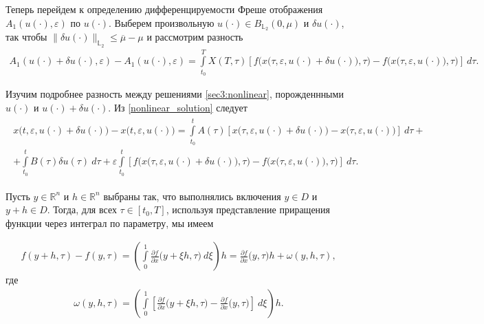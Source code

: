 \documentclass[../main.tex]{subfiles}
\begin{document}
Теперь перейдем к определению дифференцируемости Фреше отображения $A_1(u(\cdot),\varepsilon)$ по $u(\cdot)$.
Выберем произвольную $u(\cdot) \in B_{\mathbb{L}_2}(0,\mu)$ и $\delta u(\cdot)$, так чтобы $\|\delta u(\cdot)\|_{\mathbb{L}_2} \leqslant \overline{\mu}-\mu$ и рассмотрим разность
\begin{gather}\label{diff_A}
    A_1(u(\cdot) + \delta u(\cdot),\varepsilon) - A_1(u(\cdot) ,\varepsilon) = \int\limits_{t_0}^T X(T,\tau) \left[ 
    f\Big(x\big(\tau,\varepsilon, u(\cdot) + \delta u(\cdot)\big),\tau\Big) - 
    f\Big(x\big(\tau,\varepsilon, u(\cdot)\big),\tau\Big) \right]\ d\tau.
\end{gather}

Изучим подробнее разность между решениями \eqref{sec3:nonlinear}, порожденнными $u(\cdot)$ и $u(\cdot) + \delta u(\cdot)$. Из \eqref{nonlinear_solution} следует
\begin{gather}\label{diff_of_x}
    \begin{gathered}
        x\big(t,\varepsilon, u(\cdot) + \delta u(\cdot)\big) -
        x\big(t,\varepsilon, u(\cdot)\big) 
        = \int\limits_{t_0}^t A(\tau) \left[
        x\big(\tau,\varepsilon, u(\cdot) + \delta u(\cdot)\big) -
        x\big(\tau,\varepsilon, u(\cdot)\big) 
        \right]\ d\tau + \\ +
        \int\limits_{t_0}^t B(\tau) \delta u(\tau)\ d\tau +
        \varepsilon\int\limits_{t_0}^t \left[ 
        f\Big(x\big(\tau,\varepsilon, u(\cdot) + \delta u(\cdot)\big),\tau\Big) -
        f\Big(x\big(\tau,\varepsilon, u(\cdot)\big),\tau\Big)
        \right]\ d\tau.
    \end{gathered}
\end{gather}

Пусть $y \in \mathbb{R}^n$ и $h \in \mathbb{R}^n$ выбраны так, что выполнялись включения $y\in D$ и $y+h \in D$. Тогда, для всех $\tau \in [t_0,T]$, используя представление приращения функции через интеграл по параметру, мы имеем

\begin{gather*}
    f(y + h, \tau) - f(y,\tau) = 
    \left( \int\limits_{0}^{1} 
    \frac{\partial f}{\partial x}  \big(y + \xi h, \tau\big)\ d\xi \right) h =
    \frac{\partial f}{\partial x}  \big(y, \tau\big) h + \omega(y,h,\tau),
\end{gather*}
где 
\begin{gather*}
    \omega(y,h,\tau) = \left( \int\limits_{0}^{1} 
    \left[\frac{\partial f}{\partial x}  \big(y + \xi h, \tau\big) -
    \frac{\partial f}{\partial x}  \big(y, \tau\big) \right] \ d \xi \right) h.
\end{gather*}
\end{document}
